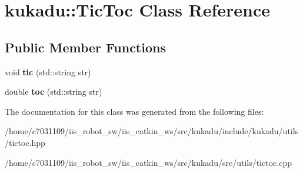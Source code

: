 \hypertarget{classkukadu_1_1TicToc}{\section{kukadu\-:\-:Tic\-Toc Class Reference}
\label{classkukadu_1_1TicToc}
}
\subsection*{Public Member Functions}
\begin{DoxyCompactItemize}
\item 
\hypertarget{classkukadu_1_1TicToc_a1033778451e91338c746153450122817}{void {\bfseries tic} (std\-::string str)}\label{classkukadu_1_1TicToc_a1033778451e91338c746153450122817}

\item 
\hypertarget{classkukadu_1_1TicToc_ae37627430c6e0e72057cfd6924c3b9f2}{double {\bfseries toc} (std\-::string str)}\label{classkukadu_1_1TicToc_ae37627430c6e0e72057cfd6924c3b9f2}

\end{DoxyCompactItemize}


The documentation for this class was generated from the following files\-:\begin{DoxyCompactItemize}
\item 
/home/c7031109/iis\-\_\-robot\-\_\-sw/iis\-\_\-catkin\-\_\-ws/src/kukadu/include/kukadu/utils/tictoc.\-hpp\item 
/home/c7031109/iis\-\_\-robot\-\_\-sw/iis\-\_\-catkin\-\_\-ws/src/kukadu/src/utils/tictoc.\-cpp\end{DoxyCompactItemize}
